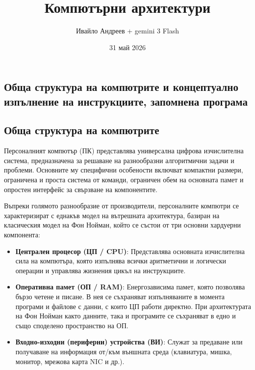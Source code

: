 \documentclass{scrartcl}
\title{Компютърни архитектури}
\author{Ивайло Андреев + gemini 3 Flash}
\date{31 май 2026}
\begin{document}
\maketitle

\tableofcontents
\newpage

\begin{FlushLeft}

\section{Обща структура на компютрите и концептуално изпълнение на инструкциите, запомнена програма} 

\subsection{Обща структура на компютрите} 
Персоналният компютър (ПК) представлява универсална цифрова изчислителна система, предназначена за решаване на разнообразни алгоритмични задачи и проблеми. Основните му специфични особености включват компактни размери, ограничена и проста система от команди, ограничен обем на основната памет и опростен интерфейс за свързване на компонентите.

Въпреки голямото разнообразие от производители, персоналните компютри се характеризират с еднакъв модел на вътрешната архитектура, базиран на класическия модел на Фон Нойман, който се състои от три основни хардуерни компонента:
\begin{itemize}
    \item \textbf{Централен процесор (ЦП / CPU)}: Представлява основната изчислителна сила на компютъра, която изпълнява всички аритметични и логически операции и управлява жизнения цикъл на инструкциите.
    \item \textbf{Оперативна памет (ОП / RAM)}: Енергозависима памет, която позволява бързо четене и писане. В нея се съхраняват изпълняваните в момента програми и файлове с данни, с които ЦП работи директно. При архитектурата на Фон Нойман както данните, така и програмите се съхраняват в едно и също споделено пространство на ОП.
    \item \textbf{Входно-изходни (периферни) устройства (ВИ)}: Служат за предаване или получаване на информация от/към външната среда (клавиатура, мишка, монитор, мрежова карта NIC и др.).
\end{itemize}


\end{FlushLeft}
\end{document}
